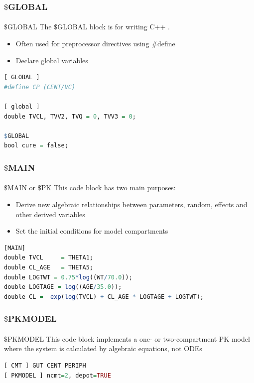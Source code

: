 \documentclass[
	11pt, %
]{beamer}
\begin{document}


\begin{frame}[fragile]
	\frametitle{$\$$GLOBAL}
	\framesubtitle{} %
	\begin{block}{$\$$GLOBAL}
	\small
	The $\$$GLOBAL block is for writing C++ . 
	\begin{itemize}
	\item Often used for preprocessor directives using $\#$define
  \item Declare global variables
  \end{itemize}
\begin{lstlisting}[language=R]
[ GLOBAL ]
#define CP (CENT/VC)

[ global ] 
double TVCL, TVV2, TVQ = 0, TVV3 = 0;

$GLOBAL
bool cure = false;
\end{lstlisting}
	\end{block}

\end{frame}


\begin{frame}[fragile]
	\frametitle{$\$$MAIN}
	\framesubtitle{} %

	\begin{block}{$\$$MAIN or $\$$PK}
	\small
This code block has two main purposes:
 \begin{itemize}
 \item Derive new algebraic relationships between parameters, random, effects and other derived variables
 \item Set the initial conditions for model compartments
 \end{itemize}
\begin{lstlisting}[language=R]	
[MAIN]
double TVCL     = THETA1;
double CL_AGE   = THETA5;
double LOGTWT = 0.75*log((WT/70.0)); 
double LOGTAGE = log((AGE/35.0));
double CL =  exp(log(TVCL) + CL_AGE * LOGTAGE + LOGTWT);
\end{lstlisting}
	\end{block}

\end{frame}



\begin{frame}[fragile]
	\frametitle{$\$$PKMODEL}
	\framesubtitle{} %

	\begin{block}{$\$$PKMODEL}
	\small
This code block implements a one- or two-compartment PK model where the system is calculated by algebraic equations, not ODEs

\begin{lstlisting}[language=R]	
[ CMT ] GUT CENT PERIPH
[ PKMODEL ] ncmt=2, depot=TRUE

\end{lstlisting}
	\end{block}

\end{frame}
\end{document}
